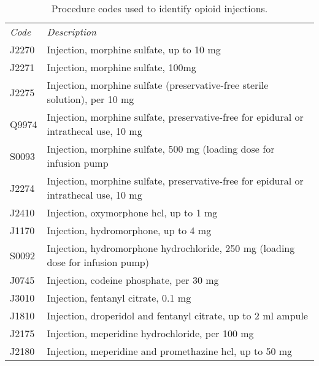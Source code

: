 \documentclass[9pt,twoside]{pnas-new}
\begin{document}
\begin{table}
\caption{Procedure codes used to identify opioid injections.}
\centering
\begin{tabular}{ll}
\em Code & \em Description \\[0.5em]
J2270 & Injection, morphine sulfate, up to 10 mg \\
J2271 & Injection, morphine sulfate, 100mg \\
J2275 & Injection, morphine sulfate (preservative-free sterile solution), per 10 mg \\
Q9974 & Injection, morphine sulfate, preservative-free for epidural or intrathecal use, 10 mg \\
S0093 & Injection, morphine sulfate, 500 mg (loading dose for infusion pump \\
J2274 & Injection, morphine sulfate, preservative-free for epidural or intrathecal use, 10 mg \\
J2410 & Injection, oxymorphone hcl, up to 1 mg \\
J1170 & Injection, hydromorphone, up to 4 mg \\
S0092 & Injection, hydromorphone hydrochloride, 250 mg (loading dose for infusion pump) \\
J0745 & Injection, codeine phosphate, per 30 mg \\
J3010 & Injection, fentanyl citrate, 0.1 mg \\
J1810 & Injection, droperidol and fentanyl citrate, up to 2 ml ampule \\
J2175 & Injection, meperidine hydrochloride, per 100 mg \\
J2180 & Injection, meperidine and promethazine hcl, up to 50 mg
\end{tabular}
\end{table}
\end{document}
